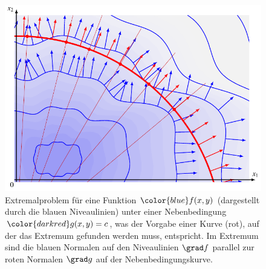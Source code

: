 %
%
%
\begin{figure}
\centering
\includegraphics{chapters/010-fuvar/images/nebenbedingung.pdf}
\caption{Extremalproblem für eine Funktion ${\color{blue}f(x,y)}$
(dargestellt durch
die {\color{blue}blauen} Niveaulinien) unter einer Nebenbedingung
${\color{darkred}g(x,y)=c}$, was der Vorgabe einer Kurve
({\color{darkred}rot}), auf der das Extremum gefunden werden muss,
entspricht.
Im Extremum sind die {\color{blue}blauen} Normalen auf den Niveaulinien
$\grad f$ parallel zur {\color{darkred}roten} Normalen $\grad g$ auf
der Nebenbedingungskurve.
\label{buch:fuvar:nebenbedingungen:fig:nebenbedingung}}
\end{figure}
